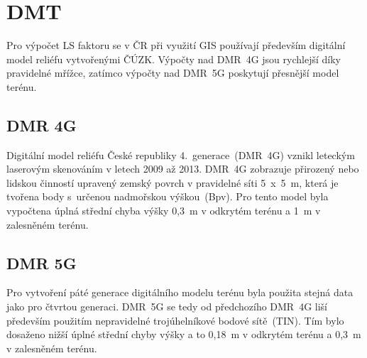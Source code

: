 \section{DMT}
Pro výpočet LS faktoru se v ČR při využití GIS používají především
digitální model reliéfu vytvořenými ČÚZK\cite{cuzk}. Výpočty nad
DMR~4G jsou rychlejší díky pravidelné mřížce, zatímco výpočty nad
DMR~5G poskytují přesnější model terénu.
\subsection{DMR 4G}
Digitální model reliéfu České republiky 4.~generace~(DMR~4G)
vznikl leteckým laserovým skenováním v letech 2009 až 2013. DMR~4G 
zobrazuje přirozený nebo lidskou činností upravený zemský povrch v 
pravidelné síti 5~x~5~m, která je tvořena body s~určenou nadmořskou
výškou~(Bpv). Pro tento model byla vypočtena úplná střední chyba výšky
0,3~m v odkrytém terénu a 1~m v zalesněném terénu.
\subsection{DMR 5G}
Pro vytvoření páté generace digitálního modelu terénu byla použita
stejná data jako pro čtvrtou generaci. DMR~5G se tedy od předchozího
DMR~4G liší především použitím nepravidelné trojúhelníkové bodové
sítě~(TIN). Tím bylo dosaženo nižší úplné střední chyby výšky a to
0,18~m v odkrytém terénu a 0,3~m v zalesněném terénu.
